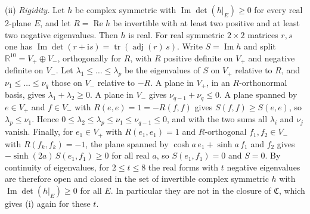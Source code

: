 (ii) \emph{Rigidity.} Let \(h\) be complex symmetric with \(\operatorname{Im}\det(h|_E)\ge0\) for every real 2-plane \(E\), and let \(R=\operatorname{Re}h\) be invertible with at least two positive and at least two negative eigenvalues. Then \(h\) is real. For real symmetric \(2\times2\) matrices \(r,s\) one has \(\operatorname{Im}\det(r+\mathrm is)=\operatorname{tr}(\operatorname{adj}(r)\,s)\). Write \(S=\operatorname{Im}h\) and split \(\mathbb R^{10}=V_+\oplus V_-\), orthogonally for \(R\), with \(R\) positive definite on \(V_+\) and negative definite on \(V_-\). Let \(\lambda_1\le\dots\le\lambda_p\) be the eigenvalues of \(S\) on \(V_+\) relative to \(R\), and \(\nu_1\le\dots\le\nu_q\) those on \(V_-\) relative to \(-R\). A plane in \(V_+\), in an \(R\)-orthonormal basis, gives \(\lambda_1+\lambda_2\ge0\). A plane in \(V_-\) gives \(\nu_{q-1}+\nu_q\le0\). A plane spanned by \(e\in V_+\) and \(f\in V_-\) with \(R(e,e)=1=-R(f,f)\) gives \(S(f,f)\ge S(e,e)\), so \(\lambda_p\le\nu_1\). Hence \(0\le\lambda_2\le\lambda_p\le\nu_1\le\nu_{q-1}\le0\), and with the two sums all \(\lambda_i\) and \(\nu_j\) vanish. Finally, for \(e_1\in V_+\) with \(R(e_1,e_1)=1\) and \(R\)-orthogonal \(f_1,f_2\in V_-\) with \(R(f_k,f_k)=-1\), the plane spanned by \(\cosh a\,e_1+\sinh a\,f_1\) and \(f_2\) gives \(-\sinh(2a)\,S(e_1,f_1)\ge0\) for all real \(a\), so \(S(e_1,f_1)=0\) and \(S=0\). By continuity of eigenvalues, for \(2\le t\le8\) the real forms with \(t\) negative eigenvalues are therefore open and closed in the set of invertible complex symmetric \(h\) with \(\operatorname{Im}\det(h|_E)\ge0\) for all \(E\). In particular they are not in the closure of \(\mathfrak C\), which gives (i) again for these \(t\).

